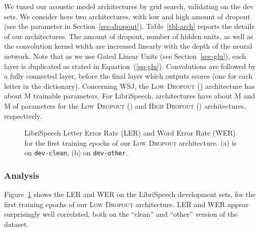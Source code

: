 \documentclass{article}
\begin{document}
We tuned our acoustic model architectures by grid search, validating on the
dev sets. We consider here two architectures, with low and high amount of
dropout (see the parameter  in Section~\ref{sec-dropout}).
Table~\ref{tbl-arch} reports the details of our architectures. The amount
of dropout, number of hidden units, as well as the convolution kernel width
are increased linearly with the depth of the neural network. Note that as
we use Gated Linear Units (see Section~\ref{sec-glu}), each layer is
duplicated as stated in Equation~(\ref{eq-glu}). Convolutions are followed
by a fully connected layer, before the final layer which outputs 
scores (one for each letter in the dictionary). Concerning WSJ, the
\textsc{Low Dropout} () architecture has about M trainable
parameters. For LibriSpeech, architectures have about M and
M of parameters for the \textsc{Low Dropout} () and
\textsc{High Dropout} () architectures, respectively.

\begin{figure}
  \centering
  \caption{
    \label{fig-ler-wer}
    LibriSpeech Letter Error Rate (LER) and Word Error Rate (WER) for the
    first training epochs of our \textsc{Low Dropout} architecture. (a) is on
    \texttt{dev-clean}, (b) on \texttt{dev-other}.  }
\end{figure}


\subsubsection{Analysis}

Figure~\ref{fig-ler-wer} shows the LER and WER on the LibriSpeech
development sets, for the first  training epochs of our \textsc{Low
  Dropout} architecture. LER and WER appear surprisingly well correlated,
both on the ``clean'' and ``other'' version of the dataset.
\end{document}
